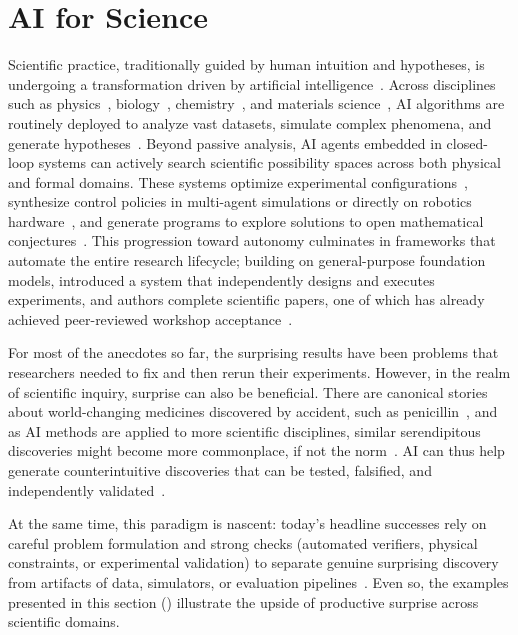 \documentclass[10pt]{article}
\def\citep#1{}%
\def\citet#1{}%
\begin{document}
\section{AI for Science}
\label{aiscience}

Scientific practice, traditionally guided by human intuition and hypotheses, is undergoing a transformation driven by artificial intelligence~\citep{lu2026towards}. 
Across disciplines such as physics~\citep{carleo2019machine}, biology~\citep{jumper2021highly}, chemistry~\citep{segler2018planning}, and materials science~\citep{butler2018machine}, AI algorithms are routinely deployed to analyze vast datasets, simulate complex phenomena, and generate hypotheses~\citep{Wang2023ai4science}. 
Beyond passive analysis, AI agents embedded in closed-loop systems can actively search scientific possibility spaces across both physical and formal domains. 
These systems optimize experimental configurations~\citep{szymanski2023autonomous, Pendleton2019escalate, autoQuantumKrenn2016}, synthesize control policies in multi-agent simulations or directly on robotics hardware~\citep{dharna2025foundationmodelselfplayopenended, codeaspolicies2022}, and generate programs to explore solutions to open mathematical conjectures~\citep{novikov2025alphaevolve, Hubert2025, yang2023leandojotheoremprovingretrievalaugmented}. 
This progression toward autonomy culminates in frameworks that automate the entire research lifecycle; building on general-purpose foundation models, \citet{lu2024aiscientist} introduced a system that independently designs and executes experiments, and authors complete scientific papers, one of which has already achieved peer-reviewed workshop acceptance~\citep{yamada2025aiscientistv2workshoplevelautomated, lu2026towards}.

For most of the anecdotes so far, the surprising results have been problems that researchers needed to fix and then rerun their experiments. 
However, in the realm of scientific inquiry, surprise can also be beneficial. 
There are canonical stories about world-changing medicines discovered by accident, such as penicillin~\citep{Bigger1927penicilin, fleming1929antibacterial}, and as AI methods are applied to more scientific disciplines, similar serendipitous discoveries might become more commonplace, if not the norm~\citep{Wang2023ai4science, lu2024aiscientist, krenn2021conceptual}. 
AI can thus help generate counterintuitive discoveries that can be tested, falsified, and independently validated~\citep{DeMoss2025Grok}.

At the same time, this paradigm is nascent: today's headline successes rely on careful problem formulation and strong checks (automated verifiers, physical constraints, or experimental validation) to separate genuine surprising discovery from artifacts of data, simulators, or evaluation pipelines~\citep{novikov2025alphaevolve, lu2024aiscientist}.
Even so, the examples presented in this section () illustrate the upside of productive surprise across scientific domains. 
\end{document}
